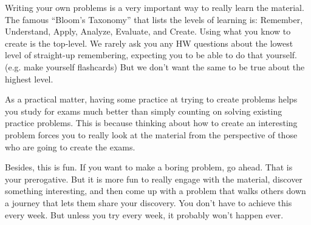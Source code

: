 \documentclass[preview]{standalone}
\begin{document}
Writing your own problems is a very important way to really learn
the material. The famous ``Bloom's Taxonomy'' that lists the levels of
learning is: Remember, Understand, Apply, Analyze, Evaluate, and
Create. Using what you know to create is the top-level. We rarely ask
you any HW questions about the lowest level of straight-up
remembering, expecting you to be able to do that yourself. (e.g. make
yourself flashcards) But we don't want the same to be true about the
highest level.

As a practical matter, having some practice at trying to create
problems helps you study for exams much better than simply counting on
solving existing practice problems. This is because thinking about how
to create an interesting problem forces you to really look at the
material from the perspective of those who are going to create the
exams. 

Besides, this is fun. If you want to make a boring problem, go
ahead. That is your prerogative. But it is more fun to really engage
with the material, discover something interesting, and then come up
with a problem that walks others down a journey that lets them share
your discovery. You don't have to achieve this every week. But unless
you try every week, it probably won't happen ever. 
\end{document}
